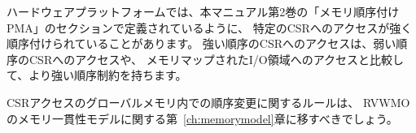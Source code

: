 ハードウェアプラットフォームでは、本マニュアル第2巻の「メモリ順序付けPMA」のセクションで定義されているように、
特定のCSRへのアクセスが強く順序付けられていることがあります。
強い順序のCSRへのアクセスは、弱い順序のCSRへのアクセスや、
メモリマップされたI/O領域へのアクセスと比較して、より強い順序制約を持ちます。

\begin{commentary}
\begin{comment}
The rules for the reordering of CSR accesses in the global memory order
should probably be moved to Chapter~\ref{ch:memorymodel} concerning the
RVWMO memory consistency model.
\end{comment}

CSRアクセスのグローバルメモリ内での順序変更に関するルールは、
RVWMOのメモリ一貫性モデルに関する第~\ref{ch:memorymodel}章に移すべきでしょう。
\end{commentary}
